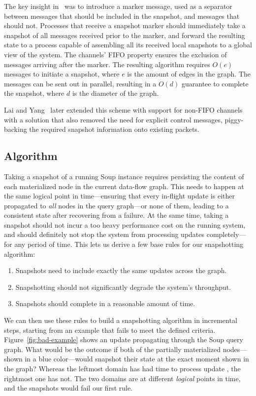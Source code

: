 The key insight in~\cite{chandy-lamport} was to introduce a marker message, used
as a separator between messages that should be included in the snapshot, and
messages that should not. Processes that receive a snapshot marker should
immediately take a snapshot of all messages received prior to the marker, and
forward the resulting state to a process capable of assembling all its received
local snapshots to a global view of the system. The channels' FIFO property
ensures the exclusion of messages arriving after the marker. The resulting
algorithm requires $ O(e) $ messages to initiate a snapshot, where $ e $
is the amount of edges in the graph. The messages can be sent out in parallel,
resulting in a $ O(d) $ guarantee to complete the snapshot, where $ d $ is the
diameter of the graph.

Lai and Yang~\cite{lai-yang} later extended this scheme with support for
non-FIFO channels with a solution that also removed the need for explicit
control messages, piggy-backing the required snapshot information onto existing
packets.

\subsection{Algorithm}

Taking a snapshot of a running Soup instance requires persisting the content of
each materialized node in the current data-flow graph. This needs to happen at
the same logical point in time---ensuring that every in-flight update is either
propagated to \textit{all} nodes in the query graph---or none of them, leading
to a consistent state after recovering from a failure. At the same time, taking
a snapshot should not incur a too heavy performance cost on the running system,
and should definitely not stop the system from processing updates
completely---for any period of time. This lets us derive a few base rules for
our snapshotting algorithm:

\begin{enumerate}
  \item Snapshots need to include exactly the same updates across the graph.
  \item Snapshotting should not significantly degrade the system's throughput.
  \item Snapshots should complete in a reasonable amount of time.
\end{enumerate}

We can then use these rules to build a snapshotting algorithm in incremental
steps, starting from an example that fails to meet the defined criteria.
Figure~\ref{fig:bad-example} shows an update propagating through the Soup query
graph. What would be the outcome if both of the partially materialized
nodes---shown in a blue color---would snapshot their state at the exact moment
shown in the graph? Whereas the leftmost domain has had time to process update
, the rightmost one has not. The two domains are at different
\textit{logical} points in time, and the snapshots would fail our first rule.

